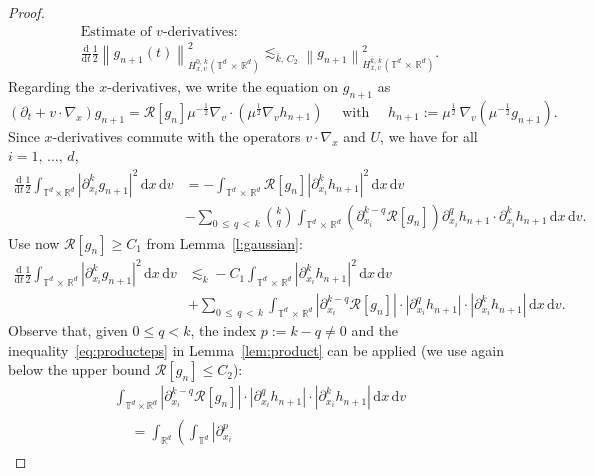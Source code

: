 \documentclass[AHL,Unicode,longabstracts,published]{cedram}
\newcommand{\R}{\mathbb{R}}
\newcommand{\T}{\mathbb{T}}
\newcommand*\fR{\mathcal{R}}
\newcommand\dt{{\frac{\mathrm d}{\mathrm dt}}}
\newcommand{\dd}{{\, \mathrm d}}
\begin{document}
\begin{proof}
\begin{multline}\label{eq:evol-v}
\text{Estimate of $v$-derivatives}:\\
\dt \frac12 \left\|g_{n+1}(t) \right\|^2_{H^{0,\,\bar k}_{x,v} \left(\T^d\,\times\,\R^d\right)}  \lesssim_{{\bar k},\,C_2}
\left\| g_{n+1} \right\|_{H^{\bar k,\,\bar k}_{x,v}\left(\T^d\,\times\,\R^d\right)} ^2.
\end{multline}
Regarding the $x$-derivatives, we write the equation on $g_{n+1}$ as
\[
(\partial_t + v \cdot \nabla_x) g_{n+1} = \fR [g_n] \mu^{-\frac12}
\nabla_v \cdot \left(\mu^{\frac12} \nabla_v h_{n+1} \right) \quad
\text{ with } \quad h_{n+1}:= \mu^{\frac12} \,\nabla_v \left(\mu^{-\frac12} g_{n+1}\right).
\]
Since $x$-derivatives commute with the operators $v\cdot
\nabla_x$ and $U$, we have for all\linebreak$i=1,\,\dots,\,d$,
\begin{align*}
\dt \frac12 \int_{\T^d \times \R^d} \left|\partial^{k}_{x_i} g_{n+1}\right|^2 \dd x \dd v &=  - \int_{\T^d\, \times\,\R^d} \fR[g_n] \left| \partial_{x_i}^k h_{n+1}\right|^2 \dd x \dd v\\
& -\!\! \sum_{0\,\le\,q\,<\,k} \binom{k}{q} \int_{\T^d\,\times \,\R^d} \left(\partial^{k - q}_{x_i} \fR[g_n]\right) \partial^{q}_{x_i} h_{n+1} \cdot \partial^{k}_{x_i} h_{n+1} \dd x \dd v.
\end{align*}
Use now $\fR[g_n] \ge C_1$ from Lemma~\ref{l:gaussian}:
\begin{align*}
\dt \frac12 \int_{\T^d\,\times\,\R^d} \left|\partial^{k}_{x_i} g_{n+1}\right|^2
\dd x \dd v &\lesssim_k  - C_1 \int_{\T^d\,\times\,\R^d} \left| \partial_{x_i}^{k}h_{n+1}\right|^2 \dd x \dd v \\
& +\!\! \sum_{0\,\le\,q\,<\,k} \int_{\T^d\,\times\,\R^d} \left|\partial^{k - q} _{x_i}
\fR[g_n]\right|\! \cdot\!\left|\partial_{x_i}^{q} h_{n+1}\right|\!
\cdot\!\left|\partial_{x_i}^{k} h_{n+1}\right| \dd x \dd v.
\end{align*}
Observe that, given $0 \le q < k$, the index $p:=k-q \not =0$ and the inequality~\eqref{eq:producteps} in Lemma~\ref{lem:product} can be applied (we use again below the upper bound $\fR[g_n] \le C_2$):
\begin{multline*}
\int_{\T^d \times \R^d} \left|\partial^{k-q} _{x_i}
\fR[g_n]\right|
\cdot \left|\partial_{x_i}^{q} h_{n+1}\right| \cdot \left|\partial_{x_i}^{k} h_{n+1}\right| \dd x \dd v \\
\begin{aligned}
& = \int_{\R^d} \left(\int_{\T^d} \left|\partial^{p} _{x_i}

\end{aligned}
\end{multline*}
\end{proof}
\end{document}
